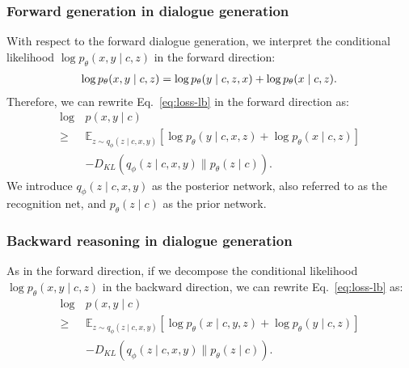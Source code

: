 \documentclass[sigconf]{acmart}
\newcounter{todocnt}
\newcommand{\todo}[1]{\textcolor{blue}{#1}\xspace}
\renewcommand{\todo}[1][$\bullet\bullet\bullet$]{%
{\refstepcounter{todocnt}%
\textcolor{blue}{$\bullet\bullet\bullet$\ \sf To do (\thetodocnt): #1}}\xspace}
\begin{document}
\subsubsection{Forward generation in dialogue generation}
With respect to the forward dialogue generation, we interpret the conditional likelihood $\log p_\theta (x, y \mid c, z)$ in the forward direction:
%
\begin{equation}
\begin{split}
\mbox{}\hspace*{-3mm}
\log p_\theta (x, y \mid c, z) 
=  \log p_\theta (y \mid c, z, x) + \log p_\theta (x \mid c, z).
\end{split}
\hspace*{-2mm}\mbox{}
\label{eq:cond-backward}
\end{equation}
%
Therefore, we can rewrite Eq.~\ref{eq:loss-lb} in the forward direction as:
%
\begin{equation}
\begin{split}
\log\, & p(x,y \mid c)\\
\geq{} & \mathbb{E}_{z \sim q_\phi(z \mid c, x, y)} [\log p_\theta (y \mid c, x, z) + \log p_\theta (x \mid c, z)] {}\\& - D_\mathit{KL}(q_\phi(z \mid c, x, y) \| p_\theta(z \mid c)).
\end{split}
\label{eq:forward-loss}
\end{equation}
We introduce $q_\phi(z \mid c, x, y)$ as the posterior network, also referred to as the recognition net, and $p_\theta(z \mid c)$ as the prior network.


\subsubsection{Backward reasoning in dialogue generation}
As in the forward direction, if we decompose the conditional likelihood $\log p_\theta (x, y \mid c, z)$ in the backward direction, we can rewrite Eq.~\ref{eq:loss-lb} as:
%
\begin{equation}
\begin{split}
\log\,& p(x,y \mid c) \\
\geq {} & \mathbb{E}_{z \sim q_\phi(z \mid c, x, y)} [\log p_\theta (x \mid c, y, z) + \log p_\theta (y \mid c, z)]  {}\\
&- D_\mathit{KL}(q_\phi(z \mid c, x, y) \| p_\theta(z \mid c)).
\end{split}
\label{eq:backward-loss}
\end{equation}
\end{document}
